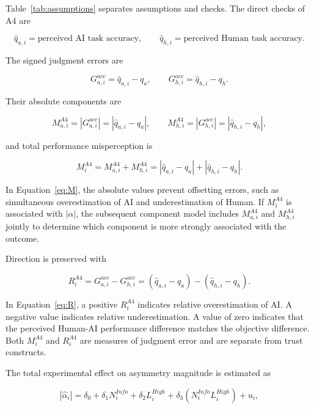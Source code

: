 \documentclass[11pt,a4paper]{article}
\begin{document}
Table~\ref{tab:assumptions} separates assumptions and checks. The direct checks of A4 are

\begin{equation*}
\widehat q_{a,i}=\text{perceived AI task accuracy},\qquad
\widehat q_{h,i}=\text{perceived Human task accuracy}.
\end{equation*}

The signed judgment errors are

\begin{equation*}
G_{a,i}^{acc}=\widehat q_{a,i}-q_a,
\qquad
G_{h,i}^{acc}=\widehat q_{h,i}-q_h.
\end{equation*}

Their absolute components are

\begin{equation*}
M_{a,i}^{A4}=|G_{a,i}^{acc}|=|\widehat q_{a,i}-q_a|,
\qquad
M_{h,i}^{A4}=|G_{h,i}^{acc}|=|\widehat q_{h,i}-q_h|,
\end{equation*}

and total performance misperception is

\begin{equation}
M_i^{A4}=M_{a,i}^{A4}+M_{h,i}^{A4}
=|\widehat q_{a,i}-q_a|+|\widehat q_{h,i}-q_h|.
\label{eq:M}
\end{equation}

In Equation~\ref{eq:M}, the absolute values prevent offsetting errors, such as simultaneous overestimation of AI and underestimation of Human. If $M_i^{A4}$ is associated with $|\alpha|$, the subsequent component model includes $M_{a,i}^{A4}$ and $M_{h,i}^{A4}$ jointly to determine which component is more strongly associated with the outcome.

Direction is preserved with

\begin{equation}
R_i^{A4}=G_{a,i}^{acc}-G_{h,i}^{acc}
=(\widehat q_{a,i}-q_a)-(\widehat q_{h,i}-q_h).
\label{eq:R}
\end{equation}

In Equation~\ref{eq:R}, a positive $R_i^{A4}$ indicates relative overestimation of AI. A negative value indicates relative underestimation. A value of zero indicates that the perceived Human-AI performance difference matches the objective difference. Both $M_i^{A4}$ and $R_i^{A4}$ are measures of judgment error and are separate from trust constructs.

The total experimental effect on asymmetry magnitude is estimated as

\begin{equation}
|\widehat\alpha_i|
=\delta_0+\delta_1N_i^{Info}+\delta_2L_i^{High}
+\delta_3(N_i^{Info}L_i^{High})+u_i,
\label{eq:treatment}
\end{equation}
\end{document}
